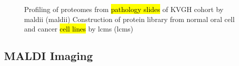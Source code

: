 \documentclass[
paper=landscape,
paper=160mm:90mm, %
fontsize=11pt, %
pagesize, %
parskip=half-, %
]{scrartcl} %
\theoremstyle{mythmstyle} %
\begin{document}
{\begin{figure}
\begin{minipage}[c]{0.35\linewidth}
\begin{picture}
  \end{picture}
  \end{minipage}\hfill
  \begin{minipage}[c]{0.55\linewidth}
    \centering
    \begin{outline}[enumerate]
        \1 Profiling of proteomes from \hl{pathology slides} of KVGH cohort by \acrshort{maldii} {\tiny (\acrlong{maldii})}
        \1 Construction of protein library from normal oral cell and cancer \hl{cell lines} by \acrshort{lcms} {\tiny (\acrlong{lcms})}

    \end{outline}
  \end{minipage}
\end{figure}




\clearpage




\thispagestyle{headings}

\subsection{MALDI Imaging}

}
\end{document}
